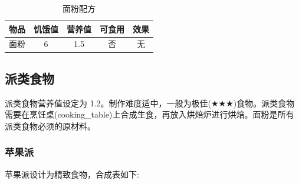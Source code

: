 \begin{table}[H]
    \centering
    \caption{面粉配方}
    \setlength{\tabcolsep}{4mm}
    \begin{tabular}{c|cc|cc}
        \toprule
        \textbf{物品} & \textbf{饥饿值} & \textbf{营养值} & \textbf{可食用} & \textbf{效果}\\
        \midrule
        面粉 & 6 & 1.5 & 否 & 无 \\
        \bottomrule
    \end{tabular}
\end{table}

\subsection{派类食物}

派类食物营养值设定为 1.2。制作难度适中，一般为极佳($\bigstar \bigstar \bigstar$)食物。派类食物需要在烹饪桌(cooking\_table)上合成生食，再放入烘焙炉进行烘焙。面粉是所有派类食物必须的原材料。

\subsubsection{苹果派}

苹果派设计为精致食物，合成表如下:

